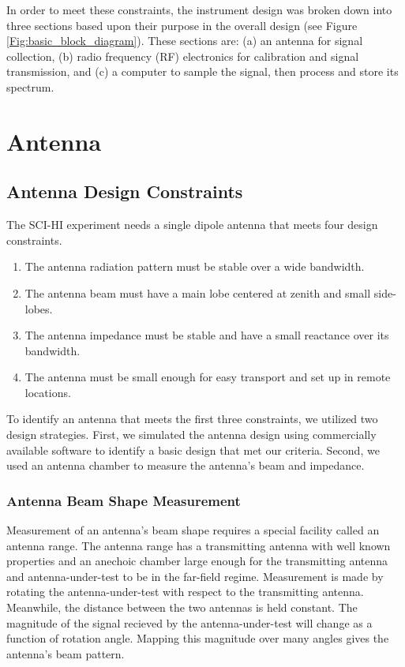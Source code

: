 In order to meet these constraints, the instrument design was broken down into three sections based upon their purpose in the overall design (see Figure \ref{Fig:basic_block_diagram}). These sections are: (a) an antenna for signal collection, (b) radio frequency (RF) electronics for calibration and signal transmission, and (c) a computer to sample the signal, then process and store its spectrum. 



\section{Antenna}


\subsection{Antenna Design Constraints}

The SCI-HI experiment needs a single dipole antenna that meets four design constraints. 

\begin{enumerate}

\item The antenna radiation pattern must be stable over a wide bandwidth. 

\item The antenna beam must have a main lobe centered at zenith and small side-lobes. 

\item The antenna impedance must be stable and have a small reactance over its bandwidth. 

\item The antenna must be small enough for easy transport and set up in remote locations. 

\end{enumerate}

To identify an antenna that meets the first three constraints, we utilized two design strategies. First, we simulated the antenna design using commercially available software to identify a basic design that met our criteria. Second, we used an antenna chamber to measure the antenna's beam and impedance. 

\subsubsection{Antenna Beam Shape Measurement}

Measurement of an antenna's beam shape requires a special facility called an antenna range. The antenna range has a transmitting antenna with well known properties and an anechoic chamber large enough for the transmitting antenna and antenna-under-test to be in the far-field regime. Measurement is made by rotating the antenna-under-test with respect to the transmitting antenna. Meanwhile, the distance between the two antennas is held constant. The magnitude of the signal recieved by the antenna-under-test will change as a function of rotation angle. Mapping this magnitude over many angles gives the antenna's beam pattern. 

